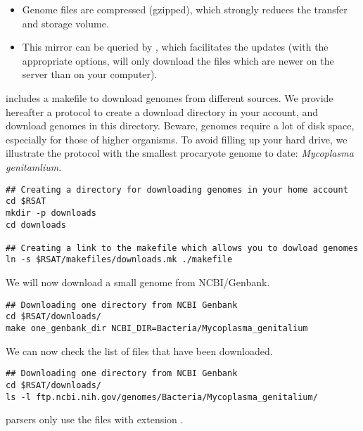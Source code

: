 \begin{itemize}
\item Genome files are compressed (gzipped), which strongly reduces
  the transfer and storage volume. 
\item This mirror can be queried by , which facilitates
  the updates (with the appropriate options,  will only
  download the files which are newer on the server than on your
  computer).
\end{itemize}

\RSAT includes a makefile to download genomes from different sources.
We provide hereafter a protocol to create a download directory in your
account, and download genomes in this directory. Beware, genomes
require a lot of disk space, especially for those of higher
organisms. To avoid filling up your hard drive, we illustrate the protocol
with the smallest procaryote genome to date: \textit{Mycoplasma
  genitamlium}.


\begin{footnotesize}
\begin{verbatim}
## Creating a directory for downloading genomes in your home account
cd $RSAT
mkdir -p downloads
cd downloads

## Creating a link to the makefile which allows you to dowload genomes
ln -s $RSAT/makefiles/downloads.mk ./makefile
\end{verbatim}
\end{footnotesize}

We will now download a small genome from NCBI/Genbank. 

\begin{footnotesize}
\begin{verbatim}
## Downloading one directory from NCBI Genbank
cd $RSAT/downloads/
make one_genbank_dir NCBI_DIR=Bacteria/Mycoplasma_genitalium
\end{verbatim}
\end{footnotesize}

We can now check the list of files that have been downloaded.

\begin{footnotesize}
\begin{verbatim}
## Downloading one directory from NCBI Genbank
cd $RSAT/downloads/
ls -l ftp.ncbi.nih.gov/genomes/Bacteria/Mycoplasma_genitalium/
\end{verbatim}
\end{footnotesize}

\RSAT parsers only use the files with extension .

